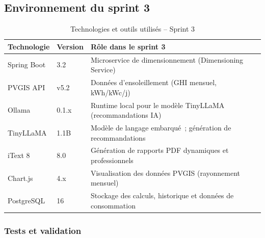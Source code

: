 \subsection{Environnement du sprint 3}

\begin{table}[H]
  \caption{Technologies et outils utilisés -- Sprint 3}
  \label{tab:tech-s3}
  \centering
  \begin{tabularx}{\textwidth}{|L{3cm}|L{3cm}|X|}
    \hline
    \textbf{Technologie} & \textbf{Version} & \textbf{Rôle dans le sprint 3} \\
    \hline
    Spring Boot & 3.2 & Microservice de dimensionnement (Dimensioning Service) \\
    \hline
    PVGIS API & v5.2 & Données d'ensoleillement (GHI mensuel, kWh/kWc/j) \\
    \hline
    Ollama & 0.1.x & Runtime local pour le modèle TinyLLaMA (recommandations IA) \\
    \hline
    TinyLLaMA & 1.1B & Modèle de langage embarqué~; génération de recommandations \\
    \hline
    iText 8 & 8.0 & Génération de rapports PDF dynamiques et professionnels \\
    \hline
    Chart.js & 4.x & Visualisation des données PVGIS (rayonnement mensuel) \\
    \hline
    PostgreSQL & 16 & Stockage des calculs, historique et données de consommation \\
    \hline
  \end{tabularx}
\end{table}

\subsubsection{Tests et validation}

